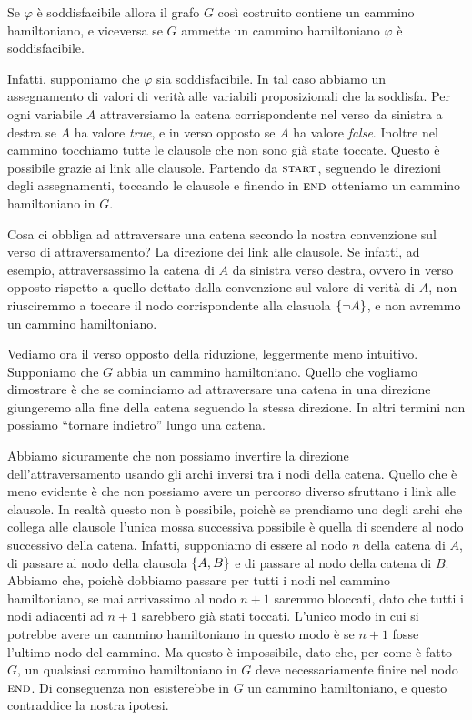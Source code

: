 Se $\varphi$ è soddisfacibile allora il grafo $G$ così costruito contiene un cammino hamiltoniano,
e viceversa se $G$ ammette un cammino hamiltoniano $\varphi$ è soddisfacibile.

Infatti, supponiamo che $\varphi$ sia soddisfacibile. In tal caso abbiamo un assegnamento di valori
di verità alle variabili proposizionali che la soddisfa. Per ogni variabile $A$ attraversiamo la
catena corrispondente nel verso da sinistra a destra se $A$ ha valore \textit{true}, e in verso
opposto se $A$ ha valore \textit{false}. Inoltre nel cammino tocchiamo tutte le clausole che non
sono già state toccate.  Questo è possibile grazie ai link alle clausole. Partendo da
$\textsc{start}$, seguendo le direzioni degli assegnamenti, toccando le clausole e finendo in
$\textsc{end}$ otteniamo un cammino hamiltoniano in $G$.

Cosa ci obbliga ad attraversare una catena secondo la nostra convenzione sul verso di
attraversamento? La direzione dei link alle clausole. Se infatti, ad esempio, attraversassimo la
catena di $A$ da sinistra verso destra, ovvero in verso opposto rispetto a quello dettato dalla
convenzione sul valore di verità di $A$, non riusciremmo a toccare il nodo corrispondente alla
clasuola $\left\{\lnot A\right\}$, e non avremmo un cammino hamiltoniano.

Vediamo ora il verso opposto della riduzione, leggermente meno intuitivo. Supponiamo che $G$ abbia
un cammino hamiltoniano. Quello che vogliamo dimostrare è che se cominciamo ad attraversare una
catena in una direzione giungeremo alla fine della catena seguendo la stessa direzione. In altri
termini non possiamo ``tornare indietro'' lungo una catena.

Abbiamo sicuramente che non possiamo invertire la direzione dell'attraversamento usando gli archi
inversi tra i nodi della catena. Quello che è meno evidente è che non possiamo avere un percorso
diverso sfruttano i link alle clausole. In realtà questo non è possibile, poichè se prendiamo uno
degli archi che collega alle clausole l'unica mossa successiva possibile è quella di scendere al
nodo successivo della catena. Infatti, supponiamo di essere al nodo $n$ della catena di $A$, di
passare al nodo della clausola $\left\{A,B\right\}$ e di passare al nodo della catena di $B$.  Abbiamo che,
poichè dobbiamo passare per tutti i nodi nel cammino hamiltoniano, se mai arrivassimo al nodo $n+1$
saremmo bloccati, dato che tutti i nodi adiacenti ad $n+1$ sarebbero già stati toccati. L'unico
modo in cui si potrebbe avere un cammino hamiltoniano in questo modo è se $n+1$ fosse l'ultimo nodo
del cammino. Ma questo è impossibile, dato che, per come è fatto $G$, un qualsiasi cammino
hamiltoniano in $G$ deve necessariamente finire nel nodo $\textsc{end}$. Di conseguenza non
esisterebbe in $G$ un cammino hamiltoniano, e questo contraddice la nostra ipotesi.

